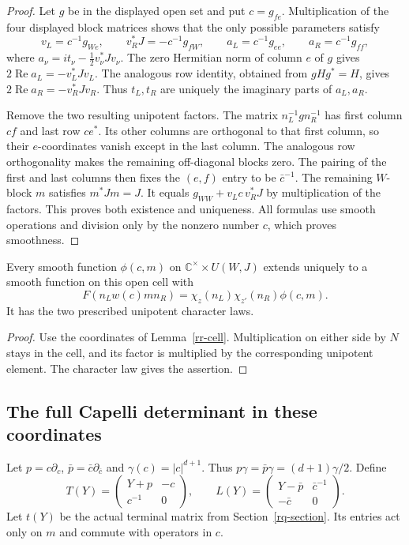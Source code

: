 \begin{proof}
Let $g$ be in the displayed open set and put $c=g_{fe}$.
Multiplication of the four displayed block matrices shows
that the only possible parameters satisfy
\[
 v_L=c^{-1}g_{We},\qquad
 v_R^*J=-c^{-1}g_{fW},\qquad
 a_L=c^{-1}g_{ee},\qquad a_R=c^{-1}g_{ff},
\]
where $a_\nu=it_\nu-\tfrac12v_\nu^*Jv_\nu$.
The zero Hermitian norm of column $e$ of $g$ gives
$2\operatorname{Re}a_L=-v_L^*Jv_L$.
The analogous row identity, obtained from $gHg^*=H$,
gives $2\operatorname{Re}a_R=-v_R^*Jv_R$.
Thus $t_L,t_R$ are uniquely the imaginary parts of
$a_L,a_R$.

Remove the two resulting unipotent factors.
The matrix $n_L^{-1}gn_R^{-1}$ has first column $cf$
and last row $ce^*$.
Its other columns are orthogonal to that first column,
so their $e$-coordinates vanish except in the last
column.  The analogous row orthogonality makes the
remaining off-diagonal blocks zero.  The pairing of
the first and last columns then fixes the $(e,f)$
entry to be $\bar c^{-1}$.
The remaining $W$-block $m$ satisfies $m^*Jm=J$.
It equals
$g_{WW}+v_Lc\,v_R^*J$ by multiplication of the factors.
This proves both existence and uniqueness.
All formulas use smooth operations and division only
by the nonzero number $c$, which proves smoothness.
\end{proof}

\begin{corollary}\label{rr-extension}
Every smooth function $\phi(c,m)$ on
$\mathbb C^\times\times U(W,J)$ extends uniquely to a
smooth function on this open cell with
\[
 F(n_Lw(c)m n_R)
                  =\chi_z(n_L)\chi_{z'}(n_R)\phi(c,m).
\]
It has the two prescribed unipotent character laws.
\end{corollary}

\begin{proof}
Use the coordinates of Lemma~\ref{rr-cell}.
Multiplication on either side by $N$ stays in the
cell, and its factor is multiplied by the corresponding
unipotent element.  The character law gives the assertion.
\end{proof}

\subsection{The full Capelli determinant in these coordinates}

Let $p=c\partial_c$, $\bar p=\bar c\partial_{\bar c}$
and $\gamma(c)=|c|^{d+1}$.  Thus
$p\gamma=\bar p\gamma=(d+1)\gamma/2$.
Define
\[
 T(Y)=\begin{pmatrix}Y+p&-c\\c^{-1}&0\end{pmatrix},
 \qquad
 L(Y)=\begin{pmatrix}Y-\bar p&\bar c^{-1}\\-\bar c&0\end{pmatrix}.
\]
Let $t(Y)$ be the actual terminal matrix from
Section~\ref{rq-section}.  Its entries act only on $m$
and commute with operators in $c$.


